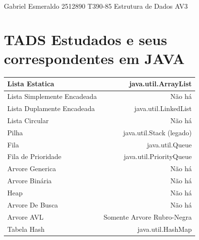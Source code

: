 \documentclass[a4paper,10pt]{article}
\begin{document}
\begin{center}
    {Gabriel Esmeraldo}
    {\textbullet}
    {2512890}
    {\textbullet}
    {T390-85} 
    {\textbullet}
    {Estrutura de Dados} 
    {\textbullet}
    {AV3} 
\end{center}


\section{TADS Estudados e seus correspondentes em JAVA}
    \begin{center}
    \begin{tabular}{ |l|r| }
        \hline
            Lista Estatica & java.util.ArrayList \\ \hline
            Lista Simplemente Encadeada & Não há \\  \hline
            Lista Duplamente Encadeada & java.util.LinkedList \\\hline
            Lista Circular & Não há \\ \hline
            Pilha & java.util.Stack (legado) \\  \hline
            Fila & java.util.Queue \\\hline
            Fila de Prioridade & java.util.PriorityQueue \\ \hline
            Arvore Generica & Não há \\  \hline
            Arvore Binária & Não há \\ \hline
            Heap & Não há \\ \hline
            Arvore De Busca & Não há \\ \hline
            Arvore AVL & Somente Arvore Rubro-Negra \\ \hline
            Tabela Hash & java.util.HashMap \\
        \hline
    \end{tabular}
    \end{center}
\end{document}
